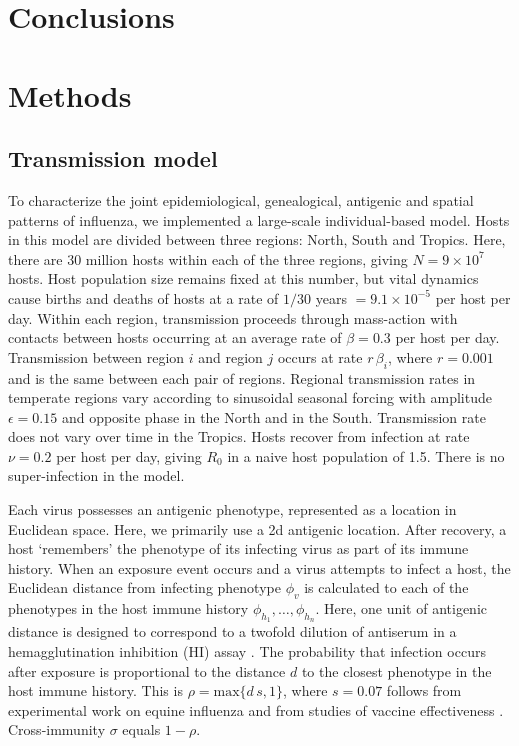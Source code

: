 \documentclass[11pt,oneside,letterpaper]{article}
\begin{document}
\section*{Conclusions}

\section*{Methods}

\subsection*{Transmission model}

To characterize the joint epidemiological, genealogical, antigenic and spatial patterns of influenza, we implemented a large-scale individual-based model.  Hosts in this model are divided between three regions: North, South and Tropics.  Here, there are 30 million hosts within each of the three regions, giving $N = 9 \times 10^{7}$ hosts.  Host population size remains fixed at this number, but vital dynamics cause births and deaths of hosts at a rate of $1 / 30$ years $= 9.1 \times 10^{-5}$ per host per day.  Within each region, transmission proceeds through mass-action with contacts between hosts occurring at an average rate of $\beta = 0.3$ per host per day.  Transmission between region $i$ and region $j$ occurs at rate $r\,\beta_i$, where $r=0.001$ and is the same between each pair of regions.  Regional transmission rates in temperate regions vary according to sinusoidal seasonal forcing with amplitude $\epsilon = 0.15$ and opposite phase in the North and in the South.  Transmission rate does not vary over time in the Tropics.  Hosts recover from infection at rate $\nu = 0.2$ per host per day, giving $R_0$ in a naive host population of 1.5.  There is no super-infection in the model.

Each virus possesses an antigenic phenotype, represented as a location in Euclidean space.  Here, we primarily use a 2d antigenic location.  After recovery, a host `remembers' the phenotype of its infecting virus as part of its immune history.  When an exposure event occurs and a virus attempts to infect a host, the Euclidean distance from infecting phenotype $\phi_v$ is calculated to each of the phenotypes in the host immune history $\phi_{h_1}, \dots, \phi_{h_n}$.  Here, one unit of antigenic distance is designed to correspond to a twofold dilution of antiserum in a hemagglutination inhibition (HI) assay \cite{Smith04}. The probability that infection occurs after exposure is proportional to the distance $d$ to the closest phenotype in the host immune history.  This is $\rho = \textrm{max}\{d\,s,1\}$, where $s=0.07$ follows from experimental work on equine influenza \cite{Park09} and from studies of vaccine effectiveness \cite{Gupta06}.  Cross-immunity $\sigma$ equals $1-\rho$.
\end{document}
